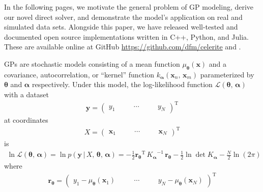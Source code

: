 \documentclass[manuscript, letterpaper]{aastex6}
\makeatletter
\let\origsection\section
\renewcommand\section{\@ifstar{\starsection}{\nostarsection}}
\newcommand\nostarsection[1]{\sectionprelude\origsection{#1}}
\newcommand\starsection[1]{\sectionprelude\origsection*{#1}}
\newcommand\sectionprelude{\vspace{1em}}
\newcommand{\project}[1]{\textsf{#1}}
\newcommand{\eqlabel}[1]{\label{eq:#1}}
\newcommand{\sectlabel}[1]{\label{sect:#1}}
\newcommand{\T}{\ensuremath{\mathrm{T}}}
\newcommand{\bvec}[1]{{\ensuremath{\boldsymbol{#1}}}}
\newcommand{\response}[1]{{#1}}
\makeatother
\begin{document}
In the following pages, we motivate the general problem of GP modeling, derive
our novel direct solver, and demonstrate the model's application on real and
simulated data sets.
Alongside this paper, we have released well-tested and documented open source
implementations written in \project{C++}, \project{Python}, and
\project{Julia}.
These are available online at \project{GitHub}
\url{https://github.com/dfm/celerite} and
.

\section{Gaussian processes}\sectlabel{gps}

GPs are stochastic models consisting of a mean function
$\mu_\bvec{\theta}(\bvec{x})$ and a covariance, autocorrelation, or ``kernel''
function $k_\bvec{\alpha}(\bvec{x}_n,\,\bvec{x}_m)$ parameterized by
$\bvec{\theta}$ and $\bvec{\alpha}$ respectively.
Under this model, \response{the log-likelihood function $\mathcal{L}
        (\bvec{\theta},\,\bvec{\alpha})$} with a dataset
\begin{eqnarray}
    \bvec{y} = \left(\begin{array}{ccccc}
            y_1\quad &  & \cdots\quad &  & y_N
        \end{array}\right)^\T
\end{eqnarray}
at coordinates
\begin{eqnarray}
    X = \left(\begin{array}{ccccc}
        \bvec{x}_1\quad &  & \cdots\quad &  & \bvec{x}_N
    \end{array}\right)^\T
\end{eqnarray}
is
\begin{eqnarray}\eqlabel{gp-likelihood}
    \ln \mathcal{L} (\bvec{\theta},\,\bvec{\alpha}) =
    \ln{p(\bvec{y}\,|\,{X,\,\bvec{\theta}},\,\bvec{\alpha})} =
    -\frac{1}{2} {\bvec{r}_\bvec{\theta}}^\T\,{K_\bvec{\alpha}}^{-1}\,
    \bvec{r}_\bvec{\theta}
    -\frac{1}{2}\ln\det K_\bvec{\alpha}
    - \frac{N}{2} \ln{(2\pi)}
\end{eqnarray}
where
\begin{eqnarray}
    \bvec{r}_\bvec{\theta} = \left(\begin{array}{ccccc}
            y_1 - \mu_\bvec{\theta}(\bvec{x}_1)\quad &  & \cdots\quad &  &
            y_N - \mu_\bvec{\theta}(\bvec{x}_N)
        \end{array}\right)^\T
\end{eqnarray}
\end{document}
